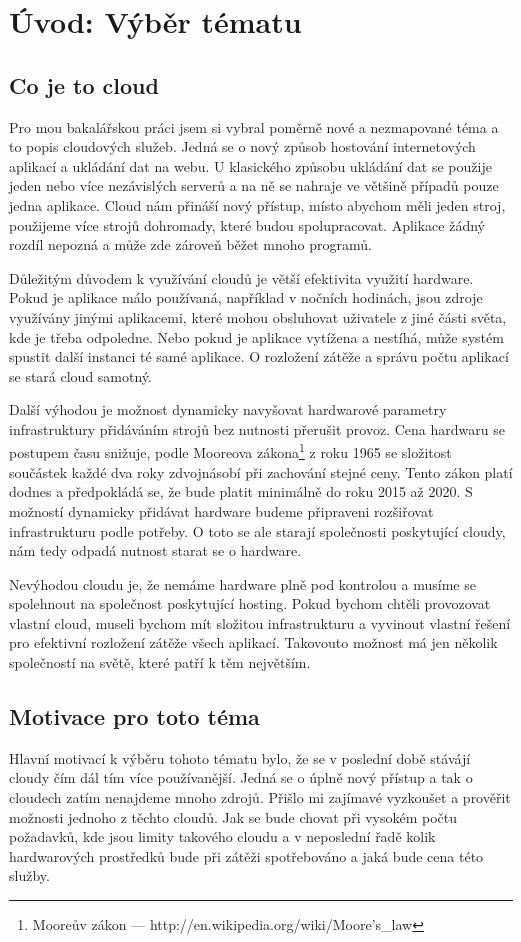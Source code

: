 \chapter{Úvod: Výběr tématu}

\section{Co je to cloud}
Pro mou bakalářskou práci jsem si vybral poměrně nové a nezmapované téma a to popis cloudových služeb. Jedná se o nový způsob hostování internetových aplikací a ukládání dat na webu. U klasického způsobu ukládání dat se použije jeden nebo více nezávislých serverů a na ně se nahraje ve většině případů pouze jedna aplikace. Cloud nám přináší nový přístup, místo abychom měli jeden stroj, použijeme více strojů dohromady, které budou spolupracovat. Aplikace žádný rozdíl nepozná a může zde zároveň běžet mnoho programů. 

Důležitým důvodem k využívání cloudů je větší efektivita využití hardware. Pokud je aplikace málo používaná, například v nočních hodinách, jsou zdroje využívány jinými aplikacemi, které mohou obsluhovat uživatele z jiné části světa, kde je třeba odpoledne. Nebo pokud je aplikace vytížena a nestíhá, může systém spustit další instanci té samé aplikace. O rozložení zátěže a správu počtu aplikací se stará cloud samotný.

Další výhodou je možnost dynamicky navyšovat hardwarové parametry infrastruktury přidáváním strojů bez nutnosti přerušit provoz. Cena hardwaru se postupem času snižuje, podle Mooreova zákona\footnote{Mooreův zákon --- http://en.wikipedia.org/wiki/Moore's\_law} z roku 1965 se složitost součástek každé dva roky zdvojnásobí při zachování stejné ceny. Tento zákon platí dodnes a předpokládá se, že bude platit minimálně do roku 2015 až 2020. S možností dynamicky přidávat hardware budeme připraveni rozšiřovat infrastrukturu podle potřeby. O toto se ale starají společnosti poskytující cloudy, nám tedy odpadá nutnost starat se o hardware. 

Nevýhodou cloudu je, že nemáme hardware plně pod kontrolou a musíme se spolehnout na společnost poskytující hosting. Pokud bychom chtěli provozovat vlastní cloud, museli bychom mít složitou infrastrukturu a vyvinout vlastní řešení pro efektivní rozložení zátěže všech aplikací. Takovouto možnost má jen několik společností na světě, které patří k těm největším.

\section{Motivace pro toto téma}
Hlavní motivací k výběru tohoto tématu bylo, že se v poslední době stávájí cloudy čím dál tím více používanější. Jedná se o úplně nový přístup a tak o cloudech zatím nenajdeme mnoho zdrojů. Přišlo mi zajímavé vyzkoušet a prověřit možnosti jednoho z těchto cloudů. Jak se bude chovat při vysokém počtu požadavků, kde jsou limity takového cloudu a v neposlední řadě kolik hardwarových prostředků bude při zátěži spotřebováno a jaká bude cena této služby.

